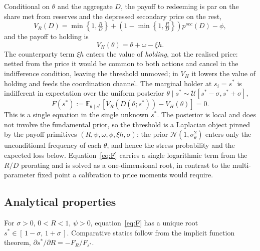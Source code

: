 Conditional on $\theta$ and the aggregate $D$, the payoff to redeeming is par on the share met from reserves and the depressed secondary price on the rest,
\begin{equation}\label{eq:VR}
V_R(D) = \min\!\left\{1, \tfrac{R}{D}\right\} + \left(1 - \min\!\left\{1, \tfrac{R}{D}\right\}\right) p^{sec}(D) - \phi,
\end{equation}
and the payoff to holding is
\begin{equation}\label{eq:VH}
V_H(\theta) = \theta + \omega - \xi h.
\end{equation}
The counterparty term $\xi h$ enters the value of \emph{holding}, not the realised price: netted from the price it would be common to both actions and cancel in the indifference condition, leaving the threshold unmoved; in $V_H$ it lowers the value of holding and feeds the coordination channel. The marginal holder at $s_i = s^*$ is indifferent in expectation over the uniform posterior $\theta \mid s^* \sim \mathcal{U}[s^*-\sigma, s^*+\sigma]$,
\begin{equation}\label{eq:F}
F(s^*) := \mathbb{E}_{\theta \mid s^*}\!\left[V_R(D(\theta; s^*)) - V_H(\theta)\right] = 0.
\end{equation}
This is a single equation in the single unknown $s^*$. The posterior is local and does not involve the fundamental prior, so the threshold is a Laplacian object pinned by the payoff primitives $(R, \psi, \omega, \phi, \xi h, \sigma)$; the prior $\mathcal{N}(1,\sigma_\theta^2)$ enters only the unconditional frequency of each $\theta$, and hence the stress probability and the expected loss below. Equation~\eqref{eq:F} carries a single logarithmic term from the $R/D$ prorating and is solved as a one-dimensional root, in contrast to the multi-parameter fixed point a calibration to price moments would require.

\subsection{Analytical properties}\label{sub:model_propositions}

\begin{proposition}[Threshold]\label{prop:existence}
For $\sigma>0$, $0<R<1$, $\psi>0$, equation~\eqref{eq:F} has a unique root $s^* \in [\,1-\sigma,\,1+\sigma\,]$. Comparative statics follow from the implicit function theorem, $\partial s^*/\partial R = -F_R/F_{s^*}$.
\end{proposition}


